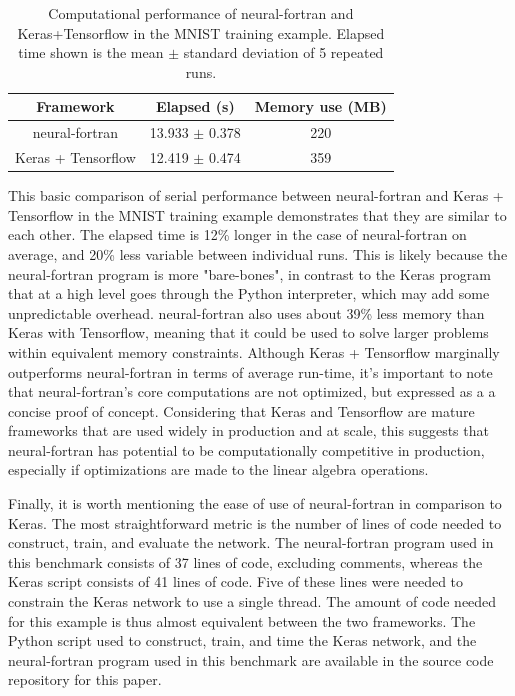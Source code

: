 \documentclass[sigplan, review=false, screen=true, balance=true]{acmart}
\begin{document}
\begin{center}
\begin{table}[h]
\caption{Computational performance of neural-fortran and Keras+Tensorflow
         in the MNIST training example. Elapsed time shown is the mean $\pm$
         standard deviation of 5 repeated runs.}
\label{serial_table}
\begin{tabular}{c|c|c}
  \hline
  Framework & Elapsed (s) & Memory use (MB) \\
  \hline
  neural-fortran     & 13.933 $\pm$ 0.378 & 220 \\
  Keras + Tensorflow & 12.419 $\pm$ 0.474 & 359 \\
  \hline
\end{tabular}
\end{table}
\end{center}

This basic comparison of serial performance between neural-fortran and
Keras + Tensorflow in the MNIST training example demonstrates that they are
similar to each other. The elapsed time is 12\% longer in the case
of neural-fortran on average, and 20\% less variable between individual runs.
This is likely because the neural-fortran program is more "bare-bones", in
contrast to the Keras program that at a high level goes through the Python
interpreter, which may add some unpredictable overhead. neural-fortran also
uses about 39\% less memory than Keras with Tensorflow, meaning that it could
be used to solve larger problems within equivalent memory constraints. Although
Keras + Tensorflow marginally outperforms neural-fortran in terms of average
run-time, it's important to note that neural-fortran's core computations are
not optimized, but expressed as a a concise proof of concept.
Considering that Keras and Tensorflow are mature frameworks that are used
widely in production and at scale, this suggests that neural-fortran has
potential to be computationally competitive in production, especially if
optimizations are made to the linear algebra operations.

Finally, it is worth mentioning the ease of use of neural-fortran in comparison
to Keras. The most straightforward metric is the number of lines of code needed to
construct, train, and evaluate the network. The neural-fortran program used
in this benchmark consists of 37 lines of code, excluding comments,
whereas the Keras script consists of 41 lines of code. Five of these lines
were needed to constrain the Keras network to use a single thread.
The amount of code needed for this example is thus almost equivalent
between the two frameworks.
The Python script used to construct, train, and time the Keras network,
and the neural-fortran program used in this benchmark are available in the
source code repository for this paper.
\end{document}
